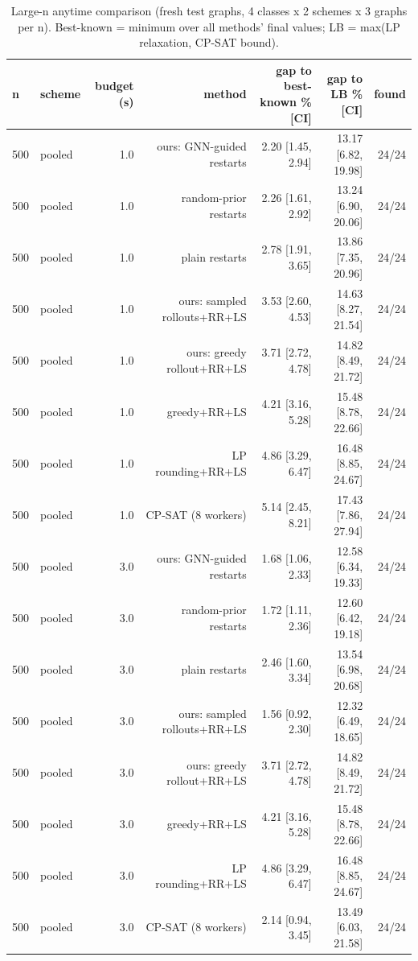 \begin{table}[t]
\centering
\caption{Large-n anytime comparison (fresh test graphs, 4 classes x 2 schemes x 3 graphs per n). Best-known = minimum over all methods' final values; LB = max(LP relaxation, CP-SAT bound).}
\label{tab:rev2_step2_gaps}
\scriptsize
\begin{tabular}{llrrrrr}
\toprule
n & scheme & budget (s) & method & gap to best-known \% [CI] & gap to LB \% [CI] & found \\
\midrule
500 & pooled & 1.0 & ours: GNN-guided restarts & 2.20 [1.45, 2.94] & 13.17 [6.82, 19.98] & 24/24 \\
500 & pooled & 1.0 & random-prior restarts & 2.26 [1.61, 2.92] & 13.24 [6.90, 20.06] & 24/24 \\
500 & pooled & 1.0 & plain restarts & 2.78 [1.91, 3.65] & 13.86 [7.35, 20.96] & 24/24 \\
500 & pooled & 1.0 & ours: sampled rollouts+RR+LS & 3.53 [2.60, 4.53] & 14.63 [8.27, 21.54] & 24/24 \\
500 & pooled & 1.0 & ours: greedy rollout+RR+LS & 3.71 [2.72, 4.78] & 14.82 [8.49, 21.72] & 24/24 \\
500 & pooled & 1.0 & greedy+RR+LS & 4.21 [3.16, 5.28] & 15.48 [8.78, 22.66] & 24/24 \\
500 & pooled & 1.0 & LP rounding+RR+LS & 4.86 [3.29, 6.47] & 16.48 [8.85, 24.67] & 24/24 \\
500 & pooled & 1.0 & CP-SAT (8 workers) & 5.14 [2.45, 8.21] & 17.43 [7.86, 27.94] & 24/24 \\
500 & pooled & 3.0 & ours: GNN-guided restarts & 1.68 [1.06, 2.33] & 12.58 [6.34, 19.33] & 24/24 \\
500 & pooled & 3.0 & random-prior restarts & 1.72 [1.11, 2.36] & 12.60 [6.42, 19.18] & 24/24 \\
500 & pooled & 3.0 & plain restarts & 2.46 [1.60, 3.34] & 13.54 [6.98, 20.68] & 24/24 \\
500 & pooled & 3.0 & ours: sampled rollouts+RR+LS & 1.56 [0.92, 2.30] & 12.32 [6.49, 18.65] & 24/24 \\
500 & pooled & 3.0 & ours: greedy rollout+RR+LS & 3.71 [2.72, 4.78] & 14.82 [8.49, 21.72] & 24/24 \\
500 & pooled & 3.0 & greedy+RR+LS & 4.21 [3.16, 5.28] & 15.48 [8.78, 22.66] & 24/24 \\
500 & pooled & 3.0 & LP rounding+RR+LS & 4.86 [3.29, 6.47] & 16.48 [8.85, 24.67] & 24/24 \\
500 & pooled & 3.0 & CP-SAT (8 workers) & 2.14 [0.94, 3.45] & 13.49 [6.03, 21.58] & 24/24 \\

\end{tabular}
\end{table}
